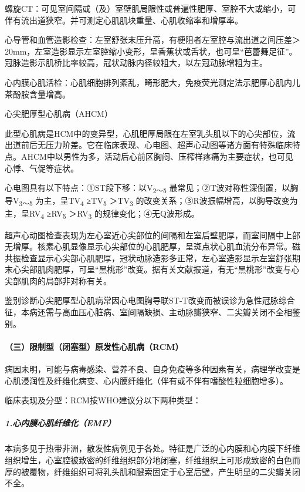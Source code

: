 螺旋CT：可见室间隔或（及）室壁肌局限性或普遍性肥厚、室腔不大或缩小，可伴有流出道狭窄。并可测定心肌肌块重量、心肌收缩率和增厚率。

心导管和血管造影检查：左室舒张末压升高，有梗阻者左室腔与流出道之间压差＞20mm，左室造影显示左室腔缩小变形，呈香蕉状或舌状，也可呈“芭蕾舞足征”。冠脉造影示肌桥比率较高，冠状动脉内径较粗大，以左冠动脉增粗为主。

心内膜心肌活检：心肌细胞排列紊乱，畸形肥大，免疫荧光测定法示肥厚心肌内儿茶酚胺含量增高。

心尖肥厚型心肌病（AHCM）

此型心肌病是HCM中的变异型，心肌肥厚局限在左室乳头肌以下的心尖部位，流出道前后无压力阶差。它在临床表现、心电图、超声心动图等诸方面有特殊临床特点。AHCM中以男性为多，活动后心前区胸闷、压榨样疼痛为主要症状，也可见心悸、气促等症状。

心电图具有以下特点：①ST段下移：以V\textsubscript{2～5}
最常见；②T波对称性深倒置，以胸导V\textsubscript{3～5}
为主，呈TV\textsubscript{4} ≥TV\textsubscript{5} ＞TV\textsubscript{3}
的改变关系；③R波振幅增高，以胸导改变为主，呈RV\textsubscript{4}
≥RV\textsubscript{5} ＞RV\textsubscript{3} 的规律变化；④无Q波形成。

超声心动图检查表现为左心室近心尖部位的间隔和左室后壁肥厚，而室间隔中上部无增厚。核素心肌显像显示心尖部位的心肌肥厚，呈斑点状心肌血流分布异常。磁共振检查显示心尖部心肌肥厚，冠状动脉造影多正常，左心室造影显示左室舒张期末心尖部肌肉肥厚，可呈“黑桃形”改变。据有关文献报道，有无“黑桃形”改变与心尖部肌肉的局部非对称有关。

鉴别诊断心尖肥厚型心肌病常因心电图胸导联ST-T改变而被误诊为急性冠脉综合征，本病还需与高血压心脏病、室间隔缺损、主动脉瓣狭窄、二尖瓣关闭不全相鉴别。

\paragraph{（三）限制型（闭塞型）原发性心肌病（RCM）}

病因未明，可能与病毒感染、营养不良、自身免疫等多种因素有关，病理学改变是心肌浸润性及纤维化病变、心内膜纤维化（伴有或不伴有嗜酸性粒细胞增多）。

临床表现及分型：RCM按WHO建议分以下两种类型：

\subparagraph{1.心内膜心肌纤维化（EMF）}

本病多见于热带非洲，散发性病例见于各处。特征是广泛的心内膜和心内膜下纤维组织增生，心室腔被致密的纤维组织部分地闭塞，纤维组织上可形成致密的白色而厚的被覆物，纤维组织可将乳头肌和腱索固定于心室后壁，产生明显的二尖瓣关闭不全。

